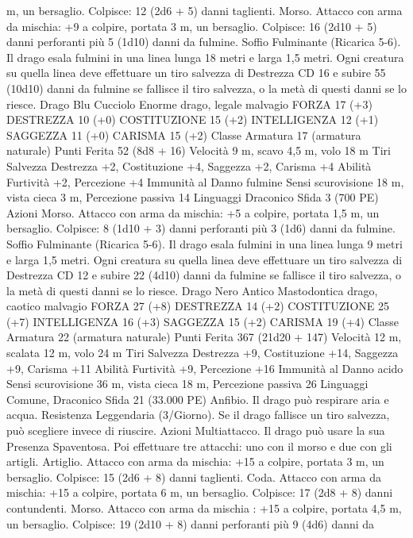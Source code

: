 \begin{multicols}{2}
m, un bersaglio.
Colpisce: 12 (2d6 + 5) danni taglienti.
Morso. Attacco con arma da mischia: +9 a colpire, portata 3 m,
un bersaglio.
Colpisce: 16 (2d10 + 5) danni perforanti più 5 (1d10) danni da
fulmine.
Soffio Fulminante (Ricarica 5-6). Il drago esala fulmini in una linea
lunga 18 metri e larga 1,5 metri. Ogni creatura su quella linea deve
effettuare un tiro salvezza di Destrezza CD 16 e subire 55 (10d10) danni
da fulmine se fallisce il tiro salvezza, o la metà di questi danni se lo riesce.
Drago Blu Cucciolo
Enorme drago, legale malvagio
FORZA 17 (+3)
DESTREZZA 10 (+0)
COSTITUZIONE 15 (+2)
INTELLIGENZA 12 (+1)
SAGGEZZA 11 (+0)
CARISMA 15 (+2)
Classe Armatura 17 (armatura naturale)
Punti Ferita 52 (8d8 + 16)
Velocità 9 m, scavo 4,5 m, volo 18 m
Tiri Salvezza Destrezza +2, Costituzione +4, Saggezza +2,
Carisma +4
Abilità Furtività +2, Percezione +4
Immunità al Danno fulmine
Sensi scurovisione 18 m, vista cieca 3 m, Percezione passiva 14
Linguaggi Draconico
Sfida 3 (700 PE)
Azioni
Morso. Attacco con arma da mischia: +5 a colpire, portata 1,5
m, un bersaglio.
Colpisce: 8 (1d10 + 3) danni perforanti più 3 (1d6) danni da
fulmine.
Soffio Fulminante (Ricarica 5-6). Il drago esala fulmini in una
linea lunga 9 metri e larga 1,5 metri. Ogni creatura su quella
linea deve effettuare un tiro salvezza di Destrezza CD 12 e subire
22 (4d10) danni da fulmine se fallisce il tiro salvezza, o la metà
di questi danni se lo riesce.
Drago Nero Antico
Mastodontica drago, caotico malvagio
FORZA 27 (+8)
DESTREZZA 14 (+2)
COSTITUZIONE 25 (+7)
INTELLIGENZA 16 (+3)
SAGGEZZA 15 (+2)
CARISMA 19 (+4)
Classe Armatura 22 (armatura naturale)
Punti Ferita 367 (21d20 + 147)
Velocità 12 m, scalata 12 m, volo 24 m
Tiri Salvezza Destrezza +9, Costituzione +14, Saggezza +9,
Carisma +11
Abilità Furtività +9, Percezione +16
Immunità al Danno acido
Sensi scurovisione 36 m, vista cieca 18 m, Percezione passiva 26
Linguaggi Comune, Draconico
Sfida 21 (33.000 PE)
Anfibio. Il drago può respirare aria e acqua.
Resistenza Leggendaria (3/Giorno). Se il drago fallisce un tiro
salvezza, può scegliere invece di riuscire.
Azioni
Multiattacco. Il drago può usare la sua Presenza Spaventosa. Poi
effettuare tre attacchi: uno con il morso e due con gli artigli.
Artiglio. Attacco con arma da mischia: +15 a colpire, portata 3
m, un bersaglio.
Colpisce: 15 (2d6 + 8) danni taglienti.
Coda. Attacco con arma da mischia: +15 a colpire, portata 6 m,
un bersaglio.
Colpisce: 17 (2d8 + 8) danni contundenti.
Morso. Attacco con arma da mischia : +15 a colpire, portata 4,5
m, un bersaglio.
Colpisce: 19 (2d10 + 8) danni perforanti più 9 (4d6) danni da

\end{multicols}
